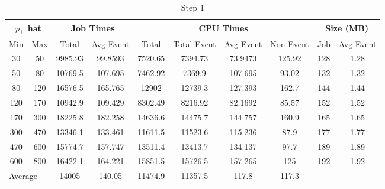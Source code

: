 \begin{table}[htp]
\centering

\begin{tabular}{|c|c||c|c||c|c|c|c||c|c|}
\hline
\multicolumn{2}{|c|}{$p_\perp$ hat} & \multicolumn{2}{|c||}{Job Times} & \multicolumn{4}{c||}{CPU Times} & \multicolumn{2}{c|}{Size (MB)} \\
\hline
Min & Max & Total & Avg Event & Total & Total Event & Avg Event & Non-Event   & Job & Avg Event \\
\hline
\hline
 30 &  50 & 9985.93 & 99.8593 & 7520.65 & 7394.73 & 73.9473 & 125.92 & 128 & 1.28 \\
 50 &  80 & 10769.5 & 107.695 & 7462.92 & 7369.9  & 107.695 &  93.02 & 132 & 1.32 \\
 80 & 120 & 16576.5 & 165.765 & 12902   & 12739.3 & 127.393 &  162.7 & 144 & 1.44 \\
120 & 170 & 10942.9 & 109.429 & 8302.49 & 8216.92 & 82.1692 &  85.57 & 152 & 1.52 \\
170 & 300 & 18225.8 & 182.258 & 14636.6 & 14475.7 & 144.757 &  160.9 & 165 & 1.65 \\
300 & 470 & 13346.1 & 133.461 & 11611.5 & 11523.6 & 115.236 &   87.9 & 177 & 1.77 \\
470 & 600 & 15774.7 & 157.747 & 13511.4 & 13413.7 & 134.137 &   97.7 & 189 & 1.89 \\
600 & 800 & 16422.1 & 164.221 & 15851.5 & 15726.5 & 157.265 &    125 & 192 & 1.92 \\
\hline
\hline
\multicolumn{2}{|l|}{Average} & 14005 & 140.05 & 11474.9 & 11357.5 & 117.8 & 117.3 &  &  \\
\hline
\end{tabular}

\caption{Step 1}
\label{table_QCD_ProdUnfiltered_Step1}
\end{table}




